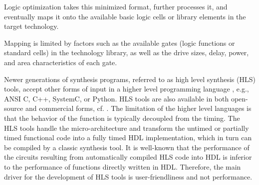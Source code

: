 Logic optimization takes this minimized format, further processes it, and eventually maps it onto the available basic logic cells or library elements in the target technology.

Mapping is limited by factors such as the available gates (logic functions or standard cells) in the technology library, as well as the drive sizes, delay, power, and area characteristics of each gate.

Newer generations of synthesis programs, referred to as high level synthesis (HLS) tools, accept other forms of input in a higher level programming language \cite{Chapter:Zhang2008,chu1989hyper,corazao1996performance}, e.g., ANSI C, C++, SystemC, or Python.
HLS tools are also available in both open-source and commercial forms, cf. \cite{tool:Vivado,decaluwe2004myhdl,tool:PandA}.
The limitation of the higher level languages is that the behavior of the function is typically decoupled from the timing.
The HLS tools handle the micro-architecture and transform the untimed or partially timed functional code into a fully timed HDL implementation, which in turn can be compiled by a classic synthesis tool.
It is well-known that the performance of the circuits resulting from automatically compiled HLS code into HDL is inferior to the performance of functions directly written in HDL.
Therefore, the main driver for the development of HLS tools is user-friendliness and not performance.
